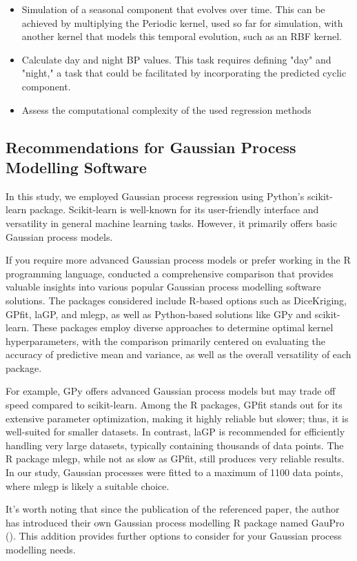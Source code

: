 \begin{itemize}
    \item Simulation of a seasonal component that evolves over time.
    This can be achieved by multiplying the Periodic kernel, used so far for simulation,
    with another kernel that models this temporal evolution, such as an RBF kernel.

    \item Calculate day and night BP values. This task requires defining "day" and "night," a task that could be
    facilitated by incorporating the predicted cyclic component.

    \item Assess the computational complexity of the used regression methods

\end{itemize}


\subsection{Recommendations for Gaussian Process Modelling Software}

In this study, we employed Gaussian process regression using Python's scikit-learn package.
Scikit-learn is well-known for its user-friendly interface and versatility in
general machine learning tasks.
However, it primarily offers basic Gaussian process models.

If you require more advanced Gaussian process models or prefer working in the R programming language,
\citeauthor{erickson_comparison_2018} conducted a comprehensive comparison that provides valuable
insights into various popular Gaussian process modelling software solutions.
The packages considered include R-based options such as DiceKriging, GPfit, laGP, and mlegp,
as well as Python-based solutions like GPy and scikit-learn.
These packages employ diverse approaches to determine optimal kernel hyperparameters,
with the comparison primarily centered on evaluating the accuracy of predictive
mean and variance, as well as the overall versatility of each package.

For example, GPy offers advanced Gaussian process models but may trade off speed compared to scikit-learn.
Among the R packages, GPfit stands out for its extensive parameter optimization,
making it highly reliable but slower; thus, it is well-suited for smaller datasets.
In contrast, laGP is recommended for efficiently handling very large datasets,
typically containing thousands of data points.
The R package mlegp, while not as slow as GPfit, still produces very reliable results.
In our study, Gaussian processes were fitted to a maximum of 1100 data points,
where mlegp is likely a suitable choice.

It's worth noting that since the publication of the referenced paper, the author
has introduced their own Gaussian process modelling R package named GauPro
(\citeauthor{erickson_gaupro_2023}).
This addition provides further options to consider for your Gaussian process modelling needs.
